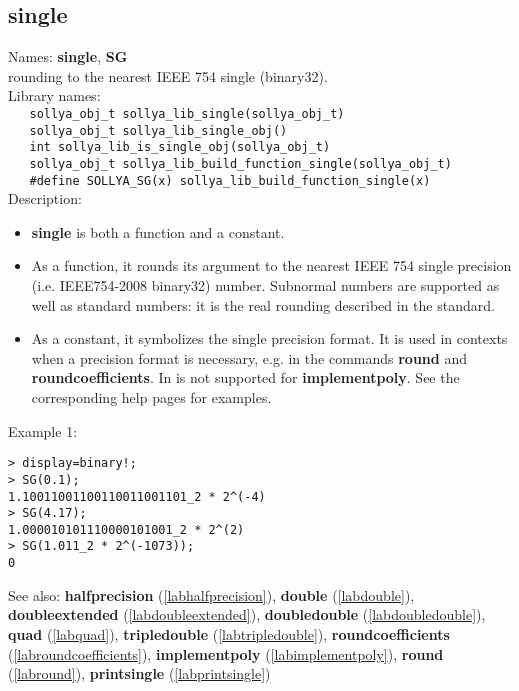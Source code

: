 \subsection{single}
\label{labsingle}
\noindent Names: \textbf{single}, \textbf{SG}\\
\phantom{aaa}rounding to the nearest IEEE 754 single (binary32).\\[0.2cm]
\noindent Library names:\\
\verb|   sollya_obj_t sollya_lib_single(sollya_obj_t)|\\
\verb|   sollya_obj_t sollya_lib_single_obj()|\\
\verb|   int sollya_lib_is_single_obj(sollya_obj_t)|\\
\verb|   sollya_obj_t sollya_lib_build_function_single(sollya_obj_t)|\\
\verb|   #define SOLLYA_SG(x) sollya_lib_build_function_single(x)|\\[0.2cm]
\noindent Description: \begin{itemize}

\item \textbf{single} is both a function and a constant.

\item As a function, it rounds its argument to the nearest IEEE 754 single precision (i.e. IEEE754-2008 binary32) number.
   Subnormal numbers are supported as well as standard numbers: it is the real
   rounding described in the standard.

\item As a constant, it symbolizes the single precision format. It is used in 
   contexts when a precision format is necessary, e.g. in the commands 
   \textbf{round} and \textbf{roundcoefficients}. In is not supported for \textbf{implementpoly}.
   See the corresponding help pages for examples.
\end{itemize}
\noindent Example 1: 
\begin{center}\begin{minipage}{15cm}\begin{Verbatim}[frame=single,commandchars=\\\|\~]
> display=binary!;
> SG(0.1);
1.10011001100110011001101_2 * 2^(-4)
> SG(4.17);
1.000010101110000101001_2 * 2^(2)
> SG(1.011_2 * 2^(-1073));
0
\end{Verbatim}
\end{minipage}\end{center}
See also: \textbf{halfprecision} (\ref{labhalfprecision}), \textbf{double} (\ref{labdouble}), \textbf{doubleextended} (\ref{labdoubleextended}), \textbf{doubledouble} (\ref{labdoubledouble}), \textbf{quad} (\ref{labquad}), \textbf{tripledouble} (\ref{labtripledouble}), \textbf{roundcoefficients} (\ref{labroundcoefficients}), \textbf{implementpoly} (\ref{labimplementpoly}), \textbf{round} (\ref{labround}), \textbf{printsingle} (\ref{labprintsingle})
